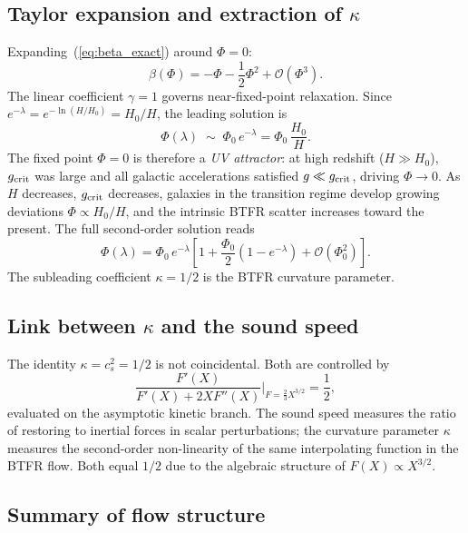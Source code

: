 \documentclass[11pt,a4paper]{article}
\begin{document}
\subsection{Taylor expansion and extraction of $\kappa$}
\label{subsec:Taylor_kappa}
Expanding~(\ref{eq:beta_exact}) around $\Phi=0$:
\begin{equation}
  \beta(\Phi) = -\Phi - \frac{1}{2}\Phi^2 + \mathcal{O}(\Phi^3).
  \label{eq:beta_expanded}
\end{equation}
The linear coefficient $\gamma = 1$ governs near-fixed-point relaxation.
Since $e^{-\lambda} = e^{-\ln(H/H_0)} = H_0/H$, the leading solution is
\begin{equation}
  \Phi(\lambda) \;\sim\; \Phi_0\,e^{-\lambda} = \Phi_0\,\frac{H_0}{H}.
  \label{eq:Phi_relaxation}
\end{equation}
The fixed point $\Phi=0$ is therefore a \emph{UV attractor}: at high redshift
($H\gg H_0$), $g_{\rm crit}$ was large and all galactic accelerations satisfied
$g\ll g_{\rm crit}$, driving $\Phi\to 0$.  As $H$ decreases, $g_{\rm crit}$
decreases, galaxies in the transition regime develop growing deviations
$\Phi\propto H_0/H$, and the intrinsic BTFR scatter increases toward the present.
The full second-order solution reads
\begin{equation}
  \Phi(\lambda) = \Phi_0\,e^{-\lambda}\!\left[1
    + \frac{\Phi_0}{2}\!\left(1 - e^{-\lambda}\right)
    + \mathcal{O}(\Phi_0^2)\right].
\end{equation}
The subleading coefficient $\kappa = 1/2$ is the BTFR curvature parameter.

\subsection{Link between $\kappa$ and the sound speed}
The identity $\kappa = c_s^2 = 1/2$ is not coincidental.  Both are controlled by
\begin{equation}
  \frac{F'(X)}{F'(X)+2XF''(X)}\bigg|_{F=\frac{2}{3}X^{3/2}} = \frac{1}{2},
\end{equation}
evaluated on the asymptotic kinetic branch.  The sound speed measures the ratio
of restoring to inertial forces in scalar perturbations; the curvature parameter
$\kappa$ measures the second-order non-linearity of the same interpolating function
in the BTFR flow.  Both equal $1/2$ due to the algebraic structure of
$F(X)\propto X^{3/2}$.

\subsection{Summary of flow structure}
\end{document}
